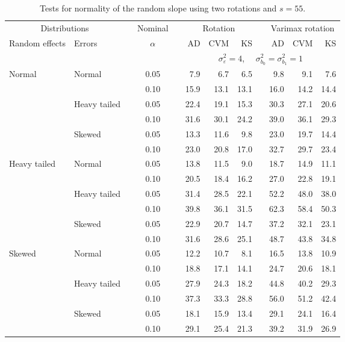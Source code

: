\begin{table}[ht]
\caption{\label{tab:simb1s55-alt}Tests for normality of the random slope using two rotations and $s = 55$.}
\begin{scriptsize}
\begin{center}
\begin{tabular}{ll p{.1cm} c p{.1cm} rrr p{.1cm} rrr}
  \hline
  \multicolumn{2}{c}{Distributions}& & Nominal & &  \multicolumn{3}{c}{Rotation} & & \multicolumn{3}{c}{Varimax rotation} \\ \cline{1-2} \cline{6-8} \cline{10-12}   
  Random effects & Errors & & $\alpha$ & & AD & CVM & KS & & AD & CVM & KS \\ 
   \hline
& && && \multicolumn{7}{c}{$\sigma_{\varepsilon}^2 = 4$, \ \ $\sigma_{b_0}^2 = \sigma_{b_1}^2 = 1$} \\ \cline{6-12}
Normal       & Normal       && 0.05 &&   7.9 & 6.7 & 6.5 &   & 9.8 & 9.1 & 7.6 \\ 
             &              && 0.10 &&   15.9 & 13.1 & 13.1 &   & 16.0 & 14.2 & 14.4 \\ 
             & Heavy tailed && 0.05 &&   22.4 & 19.1 & 15.3 &   & 30.3 & 27.1 & 20.6 \\ 
             &              && 0.10 &&   31.6 & 30.1 & 24.2 &   & 39.0 & 36.1 & 29.3 \\ 
             & Skewed       && 0.05 &&   13.3 & 11.6 & 9.8 &   & 23.0 & 19.7 & 14.4 \\ 
             &              && 0.10 &&   23.0 & 20.8 & 17.0 &   & 32.7 & 29.7 & 23.4 \\ 
Heavy tailed & Normal       && 0.05 &&   13.8 & 11.5 & 9.0 &   & 18.7 & 14.9 & 11.1 \\ 
             &              && 0.10 &&   20.5 & 18.4 & 16.2 &   & 27.0 & 22.8 & 19.1 \\ 
             & Heavy tailed && 0.05 &&   31.4 & 28.5 & 22.1 &   & 52.2 & 48.0 & 38.0 \\ 
             &              && 0.10 &&   39.8 & 36.1 & 31.5 &   & 62.3 & 58.4 & 50.3 \\ 
             & Skewed       && 0.05 &&   22.9 & 20.7 & 14.7 &   & 37.2 & 32.1 & 23.1 \\ 
             &              && 0.10 &&   31.6 & 28.6 & 25.1 &   & 48.7 & 43.8 & 34.8 \\ 
Skewed       & Normal       && 0.05 &&   12.2 & 10.7 & 8.1 &   & 16.5 & 13.8 & 10.9 \\ 
             &              && 0.10 &&   18.8 & 17.1 & 14.1 &   & 24.7 & 20.6 & 18.1 \\ 
             & Heavy tailed && 0.05 &&   27.9 & 24.3 & 18.2 &   & 44.8 & 40.2 & 29.3 \\ 
             &              && 0.10 &&   37.3 & 33.3 & 28.8 &   & 56.0 & 51.2 & 42.4 \\ 
             & Skewed       && 0.05 &&   18.1 & 15.9 & 13.4 &   & 29.1 & 24.1 & 16.4 \\ 
             &              && 0.10 &&   29.1 & 25.4 & 21.3 &   & 39.2 & 31.9 & 26.9 \\ 



\end{tabular}
\end{center}
\end{scriptsize}
\end{table}

